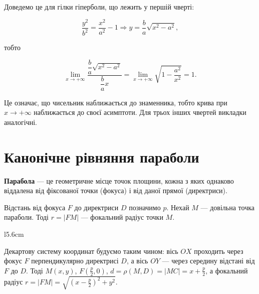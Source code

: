 Доведемо це для гілки гіперболи, що лежить у першій чверті: 

$$\dfrac{y^2}{b^2} = \dfrac{x^2}{a^2} - 1 \Rightarrow y = \dfrac{b}{a}\sqrt{x^2 - a^2},$$

тобто

$$\lim\limits_{x \rightarrow +\infty}\dfrac{\dfrac{b}{a}\sqrt{x^2-a^2}}{\dfrac{b}{a}x}
= \lim\limits_{x \rightarrow +\infty}\sqrt{1 - \dfrac{a^2}{x^2}} = 1.$$

Це означає, що чисельник наближається до знаменника, тобто крива при
$x \rightarrow +\infty$ наближається до своєї асимптоти. Для трьох інших чвертей викладки
аналогічні. 

\section{Канонічне рівняння параболи}

\begin{definition}
	\textbf{Парабола} --- це геометричне місце точок площини, кожна з яких
	однаково віддалена від фіксованої точки (фокуса) і від даної прямої (директриси).
\end{definition}

Відстань від фокуса $F$ до директриси $D$ позначимо $p$. Нехай $M$ --- довільна
точка параболи. Тоді $r = |FM|$ --- фокальний радіус точки $M$.

\begin{wrapfigure}{l}{5.6cm}\end{wrapfigure}



Декартову систему координат будуємо
таким чином: вісь $OX$ проходить через
фокус $F$ перпендикулярно директрисі $D$, а
вісь $OY$ --- через середину відстані від $F$ до
$D$. Тоді $M(x,y)$, $F(\frac{p}{2}, 0)$, $d = \rho(M,D) = |MC| = x + \frac{p}{2}$,
а фокальний радіус $r = |FM| = \sqrt{(x-\frac{p}{2})^2 + y^2}.$


